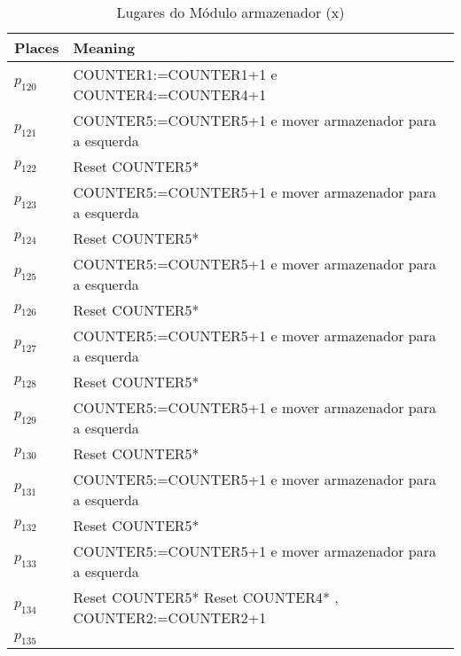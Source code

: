 \begin{table}[htbp]
\caption{Lugares do Módulo armazenador (x)}
\centering
\begin{tabular}{ll}
Places & Meaning\\
\hline
\hyperlink{partialNet:p120}{\hypertarget{partialTable:p120}{$p_{120}$}} & COUNTER1:=COUNTER1+1 e COUNTER4:=COUNTER4+1\\
\hyperlink{partialNet:p121}{\hypertarget{partialTable:p121}{$p_{121}$}} & COUNTER5:=COUNTER5+1 e mover armazenador para a esquerda\\
\hyperlink{partialNet:p122}{\hypertarget{partialTable:p122}{$p_{122}$}} & Reset COUNTER5*\\
\hyperlink{partialNet:p123}{\hypertarget{partialTable:p123}{$p_{123}$}} & COUNTER5:=COUNTER5+1 e mover armazenador para a esquerda\\
\hyperlink{partialNet:p124}{\hypertarget{partialTable:p124}{$p_{124}$}} & Reset COUNTER5*\\
\hyperlink{partialNet:p125}{\hypertarget{partialTable:p125}{$p_{125}$}} & COUNTER5:=COUNTER5+1 e mover armazenador para a esquerda\\
\hyperlink{partialNet:p126}{\hypertarget{partialTable:p126}{$p_{126}$}} & Reset COUNTER5*\\
\hyperlink{partialNet:p127}{\hypertarget{partialTable:p127}{$p_{127}$}} & COUNTER5:=COUNTER5+1 e mover armazenador para a esquerda\\
\hyperlink{partialNet:p128}{\hypertarget{partialTable:p128}{$p_{128}$}} & Reset COUNTER5*\\
\hyperlink{partialNet:p129}{\hypertarget{partialTable:p129}{$p_{129}$}} & COUNTER5:=COUNTER5+1 e mover armazenador para a esquerda\\
\hyperlink{partialNet:p130}{\hypertarget{partialTable:p130}{$p_{130}$}} & Reset COUNTER5*\\
\hyperlink{partialNet:p131}{\hypertarget{partialTable:p131}{$p_{131}$}} & COUNTER5:=COUNTER5+1 e mover armazenador para a esquerda\\
\hyperlink{partialNet:p132}{\hypertarget{partialTable:p132}{$p_{132}$}} & Reset COUNTER5*\\
\hyperlink{partialNet:p133}{\hypertarget{partialTable:p133}{$p_{133}$}} & COUNTER5:=COUNTER5+1 e mover armazenador para a esquerda\\
\hyperlink{partialNet:p134}{\hypertarget{partialTable:p134}{$p_{134}$}} & Reset COUNTER5* Reset COUNTER4* , COUNTER2:=COUNTER2+1\\
\hyperlink{partialNet:p135}{\hypertarget{partialTable:p135}{$p_{135}$}} & \\
\end{tabular}
\end{table}

